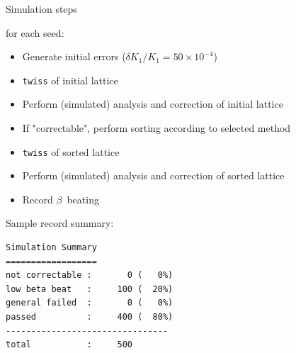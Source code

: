 \documentclass[usenames,dvipsnames,aspectratio=169,table]{beamer}
\begin{document}
\begin{frame}[fragile]
    {Simulation steps}

    for each seed:

    \begin{itemize}
        \item Generate initial errors ($\delta K_1 / K_1 = 50\times 10^{-4}$)
        \item \texttt{twiss} of initial lattice
        \item Perform (simulated) analysis and correction of initial lattice
        \item If "correctable", perform sorting according to selected method
        \item \texttt{twiss} of sorted lattice
        \item Perform (simulated) analysis and correction of sorted lattice
        \item Record $\beta$~beating
    \end{itemize}


    Sample record summary:\hspace{2em}
    \begin{minipage}[t]{0.6\linewidth}
    \footnotesize
    \begin{verbatim}
Simulation Summary
==================
not correctable :       0 (   0%)
low beta beat   :     100 (  20%)
general failed  :       0 (   0%)
passed          :     400 (  80%)
--------------------------------
total           :     500
    \end{verbatim}
    \normalsize
        \end{minipage}

    
\end{frame}

\end{document}
